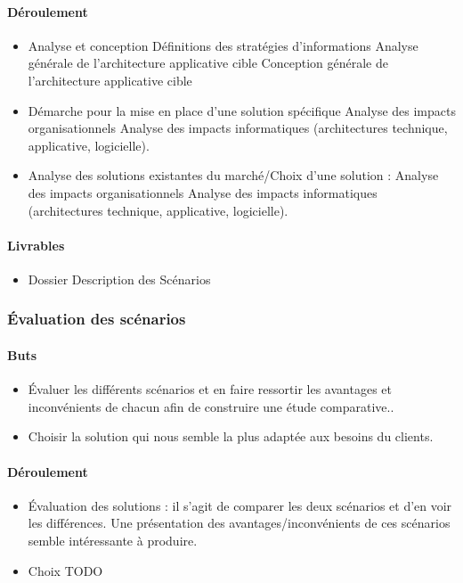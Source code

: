 \paragraph{Déroulement}
\begin{itemize}
    \item Analyse et conception
        \subitem Définitions des stratégies d’informations
        \subitem Analyse générale de l’architecture applicative cible
        \subitem Conception générale de l’architecture applicative cible
    \item Démarche pour la mise en place d’une solution spécifique
        \subitem Analyse des impacts organisationnels
        \subitem Analyse des impacts informatiques (architectures technique, applicative, logicielle).
    \item Analyse  des solutions existantes du marché/Choix d’une solution :
        \subitem Analyse des impacts organisationnels
        \subitem Analyse des impacts informatiques (architectures technique, applicative, logicielle).
\end{itemize}

\paragraph{Livrables}
\begin{itemize}
    \item Dossier Description des Scénarios
\end{itemize}

\subsubsection{Évaluation des scénarios}

\paragraph{Buts}
\begin{itemize}
    \item Évaluer les différents scénarios et en faire ressortir les avantages et inconvénients de chacun afin de construire une étude comparative..
    \item Choisir la solution qui nous semble la plus adaptée aux besoins du clients.
\end{itemize}

\paragraph{Déroulement}
\begin{itemize}
    \item Évaluation des solutions : il s’agit de comparer les deux scénarios et d’en voir les différences. Une présentation des avantages/inconvénients de ces scénarios semble intéressante à produire.
    \item Choix \huge{TODO}
\end{itemize}


